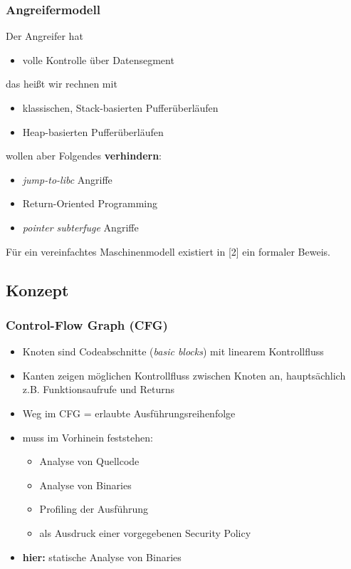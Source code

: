 \documentclass[mathserif,slidestop,compress,red]{beamer}
\begin{document}
\begin{frame}
  \frametitle{Angreifermodell}
  Der Angreifer hat
  \begin{itemize}
    \item volle Kontrolle über Datensegment
  \end{itemize}
  \pause
  das heißt wir rechnen mit
  \begin{itemize}
    \item klassischen, Stack-basierten Pufferüberläufen
    \item Heap-basierten Pufferüberläufen
  \end{itemize}
  \pause
  wollen aber Folgendes \textbf{verhindern}:
  \begin{itemize}
    \item \emph{jump-to-libc} Angriffe
    \item Return-Oriented Programming
    \item \emph{pointer subterfuge} Angriffe
  \end{itemize}
  \vspace{0.5em}
  Für ein vereinfachtes Maschinenmodell existiert in [2] ein formaler Beweis.
\end{frame}

\subsection{Konzept}

\begin{frame}
  \frametitle{Control-Flow Graph (CFG)}
  \begin{itemize}
    \item Knoten sind Codeabschnitte (\emph{basic blocks}) mit linearem Kontrollfluss
    \item Kanten zeigen möglichen Kontrollfluss zwischen Knoten an, hauptsächlich z.B. Funktionsaufrufe und Returns
    \item Weg im CFG = erlaubte Ausführungsreihenfolge
    \item muss im Vorhinein feststehen:
    \begin{itemize}
      \item Analyse von Quellcode
      \item Analyse von Binaries
      \item Profiling der Ausführung
      \item als Ausdruck einer vorgegebenen Security Policy
    \end{itemize}
    \item \textbf{hier:} statische Analyse von Binaries
  \end{itemize}
\end{frame}
\end{document}

